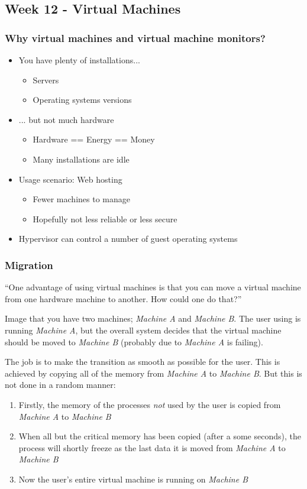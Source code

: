 \subsection*{Week 12 - Virtual Machines}
\subsubsection*{Why virtual machines and virtual machine monitors?}

\begin{itemize}
	\item You have plenty of installations...
	\begin{itemize}
		\item Servers
		\item Operating systems versions	
	\end{itemize}
	
	\item ... but not much hardware
	\begin{itemize}
		\item Hardware == Energy == Money
		\item Many installations are idle
	\end{itemize}
	\item Usage scenario: Web hosting
	\begin{itemize}
		\item Fewer machines to manage
		\item Hopefully not less reliable or less secure	
	\end{itemize}
	\item Hypervisor can control a number of guest operating systems
\end{itemize}

\subsubsection*{Migration}
``One advantage of using virtual machines is that you can move a virtual machine from one hardware machine to another. How could one do that?''

Image that you have two machines; \emph{Machine A} and \emph{Machine B}. The user using is running \emph{Machine A}, but the overall system decides that the virtual machine should be moved to \emph{Machine B} (probably due to \emph{Machine A} is failing).

The job is to make the transition as smooth as possible for the user. This is achieved by copying all of the memory from \emph{Machine A} to \emph{Machine B}. But this is not done in a random manner:
\begin{enumerate}
	\item Firstly, the memory of the processes \emph{not} used by the user is copied from \emph{Machine A} to \emph{Machine B}
	\item When all but the critical memory has been copied (after a some seconds), the process will shortly freeze as the last data it is moved from \emph{Machine A} to \emph{Machine B}
	\item Now the user's entire virtual machine is running on \emph{Machine B}
\end{enumerate}
